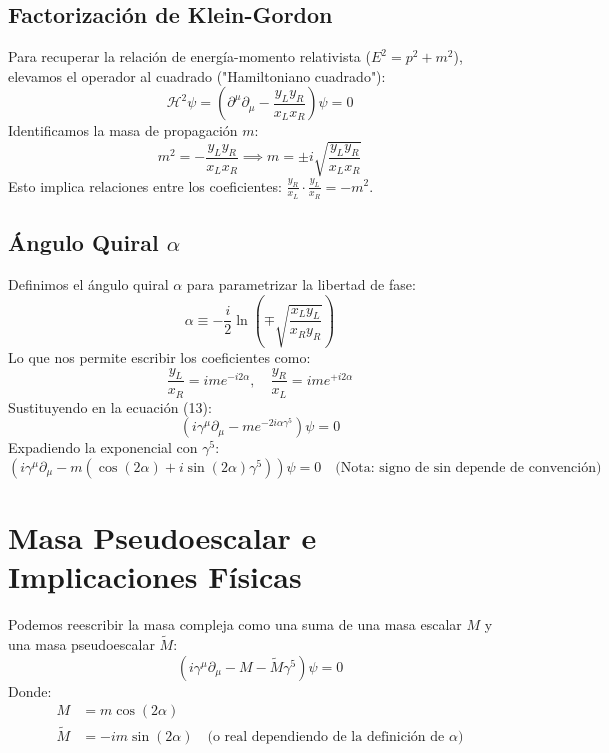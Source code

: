 \subsection{Factorización de Klein-Gordon}
Para recuperar la relación de energía-momento relativista ($E^2 = p^2 + m^2$), elevamos el operador al cuadrado ("Hamiltoniano cuadrado"):
\begin{equation}
    \mathcal{H}^2 \psi = (\partial^\mu \partial_\mu - \frac{y_L y_R}{x_L x_R})\psi = 0
\end{equation}
Identificamos la masa de propagación $m$:
\begin{equation}
    m^2 = - \frac{y_L y_R}{x_L x_R} \implies m = \pm i \sqrt{\frac{y_L y_R}{x_L x_R}}
\end{equation}
Esto implica relaciones entre los coeficientes: $\frac{y_R}{x_L} \cdot \frac{y_L}{x_R} = -m^2$.

\subsection{Ángulo Quiral $\alpha$}
Definimos el ángulo quiral $\alpha$ para parametrizar la libertad de fase:
\begin{equation}
    \alpha \equiv -\frac{i}{2} \ln\left( \mp \sqrt{\frac{x_L y_L}{x_R y_R}} \right)
\end{equation}
Lo que nos permite escribir los coeficientes como:
\begin{equation}
    \frac{y_L}{x_R} = i m e^{-i2\alpha}, \quad \frac{y_R}{x_L} = i m e^{+i2\alpha}
\end{equation}
Sustituyendo en la ecuación (13):
\begin{equation}
    (i\gamma^\mu \partial_\mu - m e^{-2i\alpha \gamma^5})\psi = 0
\end{equation}
Expadiendo la exponencial con $\gamma^5$:
\begin{equation}
    (i\gamma^\mu \partial_\mu - m(\cos(2\alpha) + i \sin(2\alpha)\gamma^5))\psi = 0 \quad \text{(Nota: signo de sin depende de convención)}
\end{equation}

\section{Masa Pseudoescalar e Implicaciones Físicas}

Podemos reescribir la masa compleja como una suma de una masa escalar $M$ y una masa pseudoescalar $\tilde{M}$:
\begin{equation}
    (i\gamma^\mu \partial_\mu - M - \tilde{M}\gamma^5)\psi = 0
\end{equation}
Donde:
\begin{align}
    M &= m \cos(2\alpha) \\
    \tilde{M} &= -i m \sin(2\alpha) \quad \text{(o real dependiendo de la definición de } \alpha \text{)}
\end{align}

